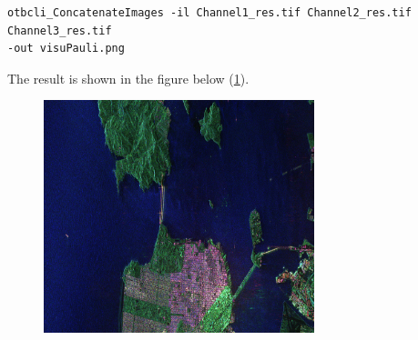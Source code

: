 \begin{verbatim} 
otbcli_ConcatenateImages -il Channel1_res.tif Channel2_res.tif Channel3_res.tif
-out visuPauli.png 
\end{verbatim}

The result is shown in the figure below (\ref{fig:colorfrisco}).

\begin{figure}[h!]
\center
\includegraphics[width=0.7\textwidth]{../Art/SARImages/visuPauli.png}
\label{fig:colorfrisco}
\end{figure}
